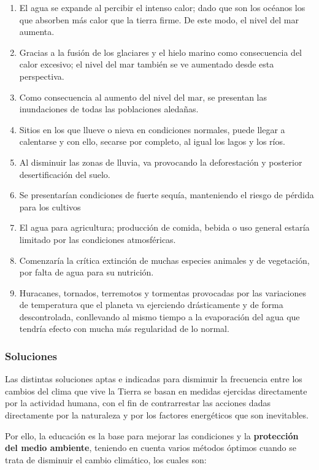 \begin{enumerate}
	\item El agua se expande al percibir el intenso calor; dado que son los océanos los
	      que absorben más calor que la tierra firme. De este modo, el nivel del mar
	      aumenta.
	\item Gracias a la fusión de los glaciares y el hielo marino como consecuencia del
	      calor excesivo; el nivel del mar también se ve aumentado desde esta
	      perspectiva.
	\item Como consecuencia al aumento del nivel del mar, se presentan las inundaciones
	      de todas las poblaciones aledañas.
	\item Sitios en los que llueve o nieva en condiciones normales, puede llegar a
	      calentarse y con ello, secarse por completo, al igual los lagos y los ríos.
	\item Al disminuir las zonas de lluvia, va provocando la deforestación y
	      posterior desertificación del suelo.
	\item Se presentarían condiciones de fuerte sequía, manteniendo el riesgo de pérdida
	      para los cultivos
	\item El agua para agricultura; producción de comida, bebida o uso general estaría
	      limitado por las condiciones atmosféricas.
	\item Comenzaría la crítica extinción de muchas especies animales y de vegetación,
	      por falta de agua para su nutrición.
	\item Huracanes, tornados, terremotos y tormentas provocadas por las variaciones
	      de temperatura que el planeta va ejerciendo drásticamente y de forma descontrolada, conllevando al mismo tiempo a la evaporación del agua que
	      tendría efecto con mucha más regularidad de lo normal.
\end{enumerate}

\subsubsection{Soluciones}

Las distintas soluciones aptas e indicadas para disminuir la frecuencia entre
los cambios del clima que vive la Tierra se basan en medidas ejercidas directamente
por la actividad humana, con el fin de contrarrestar las acciones dadas directamente por
la naturaleza y por los factores energéticos que son inevitables.

Por ello, la educación es la base para mejorar las condiciones y la \textbf{protección del
	medio ambiente}, teniendo en cuenta varios métodos óptimos cuando se trata de
disminuir el cambio climático, los cuales son:


